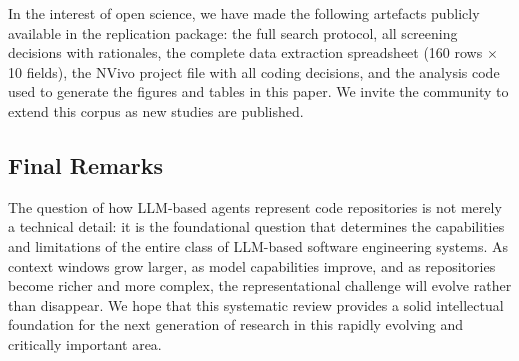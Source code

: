 In the interest of open science, we have made the following artefacts publicly available
in the replication package: the full search protocol, all screening decisions with rationales,
the complete data extraction spreadsheet (160 rows $\times$ 10 fields), the NVivo project
file with all coding decisions, and the analysis code used to generate the figures and tables
in this paper. We invite the community to extend this corpus as new studies are published.

\subsection{Final Remarks}

The question of how LLM-based agents represent code repositories is not merely a technical
detail: it is the foundational question that determines the capabilities and limitations of
the entire class of LLM-based software engineering systems. As context windows grow larger,
as model capabilities improve, and as repositories become richer and more complex, the
representational challenge will evolve rather than disappear. We hope that this systematic
review provides a solid intellectual foundation for the next generation of research in this
rapidly evolving and critically important area.
